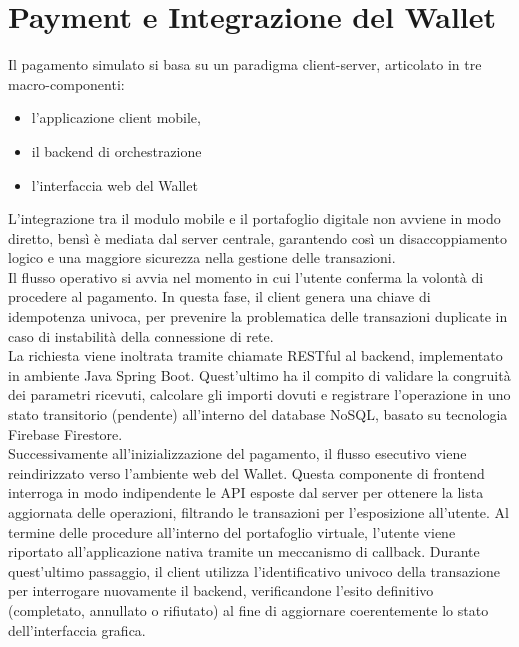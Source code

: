 \section{Payment e Integrazione del Wallet}

Il pagamento simulato si basa su un paradigma client-server, articolato in tre macro-componenti: 
\begin{itemize}
    \item l'applicazione client mobile,
    \item il backend di orchestrazione
    \item l'interfaccia web del Wallet
\end{itemize}  
L'integrazione tra il modulo mobile e il portafoglio digitale non avviene in modo diretto, bensì è mediata dal server centrale, garantendo cos\`i un disaccoppiamento logico e una maggiore sicurezza nella gestione delle transazioni.
\\
Il flusso operativo si avvia nel momento in cui l'utente conferma la volontà di procedere al pagamento. In questa fase, il client genera una chiave di idempotenza univoca,  per prevenire la problematica delle transazioni duplicate in caso di instabilit\`a della connessione di rete. \\
La richiesta viene inoltrata tramite chiamate RESTful al backend, implementato in ambiente Java Spring Boot. Quest'ultimo ha il compito di validare la congruit\`a dei parametri ricevuti, calcolare gli importi dovuti e registrare l'operazione in uno stato transitorio (pendente) all'interno del database NoSQL, basato su tecnologia Firebase Firestore.
\\
Successivamente all'inizializzazione del pagamento, il flusso esecutivo viene reindirizzato verso l'ambiente web del Wallet. Questa componente di frontend interroga in modo indipendente le API esposte dal server per ottenere la lista aggiornata delle operazioni, filtrando le transazioni per l'esposizione all'utente. Al termine delle procedure all'interno del portafoglio virtuale, l'utente viene riportato all'applicazione nativa tramite un meccanismo di callback. Durante quest'ultimo passaggio, il client utilizza l'identificativo univoco della transazione per interrogare nuovamente il backend, verificandone l'esito definitivo (completato, annullato o rifiutato) al fine di aggiornare coerentemente lo stato dell'interfaccia grafica. 
